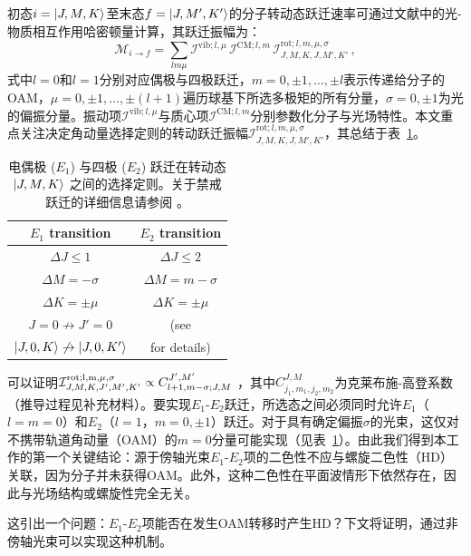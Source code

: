 \documentclass[reprint,aps,prl,twocolumn,superscriptaddress,groupedaddress]{revtex4-2}
\newcommand{\eoet}{$E_1$-$E_2$}
\begin{document}
\begin{CJK*}{UTF8}{gbsn}
初态$i=\ket{J,M,K}$至末态$f=\ket{J,M',K'}$的分子转动态跃迁速率可通过文献\cite{Maslov2024,Maslov_Thesis}中的光-物质相互作用哈密顿量计算，其跃迁振幅为：
\begin{equation}
    \mathcal{M}_{i\to f}=\sum_{lm\mu}\mathcal{I}^{\text{vib}; l,\mu}\,\mathcal{I}^{\text{CM}; l,m}\,\mathcal{I}^{\text{rot}; l,m,\mu,\sigma}_{J,M,K,J,M',K'}\,,
    \label{eq_transition_matrix}
\end{equation}
式中$l=0$和$l=1$分别对应偶极与四极跃迁，$m = 0, \pm 1, \dots, \pm l$表示传递给分子的OAM，$\mu = 0, \pm 1, \dots, \pm (l+1)$遍历球基下所选多极矩的所有分量，$\sigma =0, \pm 1$为光的偏振分量。振动项$\mathcal{I}^{\text{vib}; l,\mu}$与质心项$\mathcal{I}^{\text{CM}; l,m}$分别参数化分子与光场特性。本文重点关注决定角动量选择定则的转动跃迁振幅$\mathcal{I}^{\text{rot};l,m,\mu,\sigma}_{J,M,K,J,M',K'}$，其总结于表~\ref{SelectionRules}。
\begin{table}[ht!]
    \centering
    \begin{tabular}{c c}\hline
    \toprule
        \textbf{$E_1$ transition} & \textbf{$E_2$ transition}  \\
        \midrule
        $\Delta J\leq 1$ &  $\Delta J\leq 2$ \\
        $\Delta M=-\sigma$ & $\Delta M=m-\sigma$ \\
        $\Delta K=\pm\mu$ & $\Delta K=\pm\mu$ \\
        $J=0\not\to J'=0$ &  (see \cite{Note1}\\
        $\ket{J,0,K}\not\to\ket{J,0,K'}$ &  for details)\\
    \bottomrule
\hline
    \end{tabular}
    \caption{电偶极 ($E_1$) 与四极 ($E_2$) 跃迁在转动态 $\ket{J,M,K}$ 之间的选择定则。关于禁戒跃迁的详细信息请参阅 \cite{Note1}。}
    \label{SelectionRules}
\end{table}
可以证明$\mathcal{I}^{\rm rot; l, m, \mu, \sigma}_{J, M, K, J', M', K'} \propto C^{J',M'}_{l+1, m-\sigma; J, M}$ \cite{Maslov2024,Maslov_Thesis}，其中$C^{J, M}_{j_1, m_1, j_2, m_2}$为克莱布施-高登系数（推导过程见补充材料\cite{Note1}）。要实现\eoet 跃迁，所选态之间必须同时允许$E_1$（$l=m=0$）和$E_2$（$l = 1$，$m = 0, \pm 1$）跃迁。对于具有确定偏振$\sigma$的光束，这仅对不携带轨道角动量（OAM）的$m = 0$分量可能实现（见表~\ref{SelectionRules}）。由此我们得到本工作的第一个关键结论：源于傍轴光束\eoet 项的二色性不应与螺旋二色性（HD）关联，因为分子并未获得OAM。此外，这种二色性在平面波情形下依然存在，因此与光场结构或螺旋性完全无关。

这引出一个问题：\eoet 项能否在发生OAM转移时产生HD？下文将证明，通过非傍轴光束可以实现这种机制。


\end{CJK*}
\end{document}
